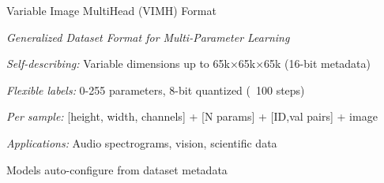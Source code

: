\begin{slidewhite}[\slideopts,toc={VIMH}]{Variable Image MultiHead (VIMH) Format}
  \vspace{-2.5em}
  
  \vspace{-0.5em}
  \emph{Generalized Dataset Format for Multi-Parameter Learning}
  \vspace{-0.5em}
  
  \begin{itemize}
    \mpitem \emph{Self-describing:} Variable dimensions up to 65k×65k×65k (16-bit metadata)
    
    \mpitem \emph{Flexible labels:} 0-255 parameters, 8-bit quantized (~100 steps)
    
    \mpitem \emph{Per sample:} [height, width, channels] + [N params] + [ID,val pairs] + image
    
    \mpitem \emph{Applications:} Audio spectrograms, vision, scientific data
    
    \mpitem Models auto-configure from dataset metadata
  \end{itemize}
\end{slidewhite}
  
